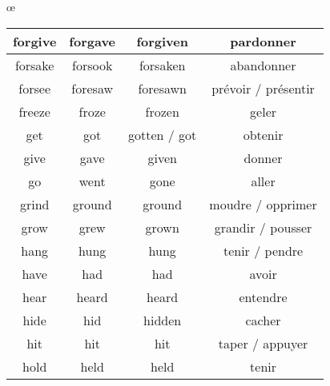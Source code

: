 œ\documentclass[a4paper,12pt,openany]{book}
\begin{document}
\begin{tabular}{|c|c|c|c|}
\hline
forgive & forgave & forgiven & pardonner\\
\hline
forsake & forsook & forsaken & abandonner\\
\hline
forsee & foresaw & foresawn & prévoir / présentir\\
\hline
freeze & froze & frozen & geler\\
\hline
get & got & gotten / got & obtenir\\
\hline
give & gave & given & donner\\
\hline
go & went & gone & aller\\
\hline
grind & ground & ground & moudre / opprimer\\
\hline
grow & grew & grown & grandir / pousser\\
\hline
hang & hung & hung & tenir / pendre\\
\hline
have & had & had & avoir\\
\hline
hear & heard & heard & entendre\\
\hline
hide & hid & hidden & cacher\\
\hline
hit & hit & hit & taper / appuyer\\
\hline
hold & held & held & tenir\\
\hline
\end{tabular}
\newpage
\end{document}
